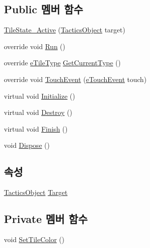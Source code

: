 \subsection*{Public 멤버 함수}
\begin{DoxyCompactItemize}
\item 
\hyperlink{class_tile_1_1_tile_state___active_a8f5d4d3fe572b8cb2a97a333467662be}{Tile\+State\+\_\+\+Active} (\hyperlink{class_tactics_object}{Tactics\+Object} target)
\item 
override void \hyperlink{class_tile_1_1_tile_state___active_ab53c7c818d65122d6d36c9681ca53bf9}{Run} ()
\item 
override \hyperlink{_tile_8cs_a271bc07be325bca511bcb747e0ff2fda}{e\+Tile\+Type} \hyperlink{class_tile_1_1_tile_state___active_afdc52754ce22e231c691a52d213dd92d}{Get\+Current\+Type} ()
\item 
override void \hyperlink{class_tile_1_1_tile_state___active_a97fa0ec14e2edc6534c4fcd3d3b3ba18}{Touch\+Event} (\hyperlink{_touch_manager_8cs_ae33e321a424fe84ba8b2fdb81ad40a68}{e\+Touch\+Event} touch)
\item 
virtual void \hyperlink{class_m_c_n_1_1_state_a5be59bc891e64cbbe4322d74a6746908}{Initialize} ()
\item 
virtual void \hyperlink{class_m_c_n_1_1_state_aebf48ef248bbf185d6aae91d9789459e}{Destroy} ()
\item 
virtual void \hyperlink{class_m_c_n_1_1_state_a2492ca731678b8216c02134dddeeb745}{Finish} ()
\item 
void \hyperlink{class_m_c_n_1_1_state_af6df0477e0dead784489688cb2c2093e}{Dispose} ()
\end{DoxyCompactItemize}
\subsection*{속성}
\begin{DoxyCompactItemize}
\item 
\hyperlink{class_tactics_object}{Tactics\+Object} \hyperlink{class_m_c_n_1_1_state_a79a563b32f183c9adc9a96679fc57eb8}{Target}
\end{DoxyCompactItemize}
\subsection*{Private 멤버 함수}
\begin{DoxyCompactItemize}
\item 
void \hyperlink{class_tile_1_1_tile_state___active_a89a5859b28fa5ad021e8dcee572aacc9}{Set\+Tile\+Color} ()
\end{DoxyCompactItemize}


